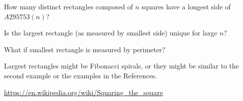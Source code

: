 \documentclass{article}
\begin{document}
\begin{question}
  How many distinct rectangles composed of $n$ squares have a longest side of
  $A295753(n)$?
\end{question}
\begin{related}
  \item Is the largest rectangle (as measured by smallest side) unique for large
  $n$?
  \item What if smallest rectangle is measured by perimeter?
\end{related}
\begin{note}
  Largest rectangles might be Fibonacci spirals, or they might be similar to the
  second example or the examples in the References.
\end{note}
\begin{references}
  \item \url{https://en.wikipedia.org/wiki/Squaring_the_square}
\end{references}
\end{document}
